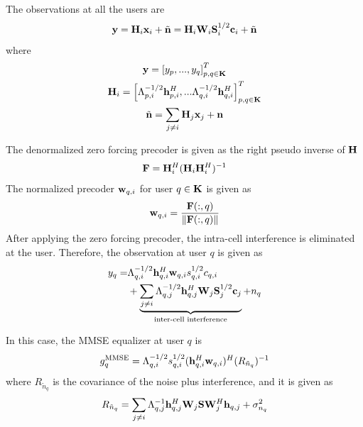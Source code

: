 \documentclass[10pt,conference]{IEEEtran}
\begin{document}
The observations at all the users are
\begin{equation}
    {\bf{y}} = {\bf{H}}_i {\bf{x}}_i + \tilde{\bf{n}} = {\bf{H}}_i {\bf{W}}_i {\bf{S}}_i^{1/2} {\bf{c}}_i + \tilde{\bf{n}}\label{eq23}
\end{equation}
where
\begin{gather}
    {\bf{y}} = \left[ y_p,...,y_q \right]^T_{p,q \in {\bf{K}}} \label{eq24}\\
    {\bf{H}}_i = \left[ \Lambda_{p,i}^{-1/2} {\bf{h}}^H_{p,i},...\Lambda_{q,i}^{-1/2} {\bf{h}}^H_{q,i} \right]^T_{p,q \in {\bf{K}}} \label{eq25}\\
    \tilde{{\bf{n}}} = \sum_{j \neq i} {\bf{H}}_j {\bf{x}}_j + {\bf{n}} \label{eq26}
\end{gather}

The denormalized zero forcing precoder is given as the right pseudo inverse of ${\bf{H}}$
\begin{equation}
    {\bf{F}} = {\bf{H}}_i^H ({\bf{H}}_i {\bf{H}}_i^H)^{-1} \label{eq27}
\end{equation}
The normalized precoder ${\bf{w}}_{q,i}$ for user $q \in {\bf{K}}$ is given as
\begin{equation}
    {\bf{w}}_{q,i} = \frac{{\bf{F}}(:,q)}{ \left\Vert {\bf{F}}(:,q) \right\Vert} \label{eq28}
\end{equation}
After applying the zero forcing precoder, the intra-cell interference is eliminated at the 
user. Therefore, the observation at user $q$ is given as
\begin{align}
    y_q = &\Lambda_{q,i}^{-1/2} {\bf{h}}^H_{q,i} {\bf{w}}_{q,i} s_{q,i}^{1/2} c_{q,i} \nonumber\\
    &+ \underbrace{\sum_{j \neq i} \Lambda_{q,j}^{-1/2} {\bf{h}}^H_{q,j} {\bf{W}}_j {\bf{S}}_j^{1/2} {\bf{c}}_j}_{\text{inter-cell interference}} + n_q \label{eq29}
\end{align}

In this case, the MMSE equalizer at user $q$ is 
\begin{equation}
    g_q^{\text{MMSE}} = \Lambda_{q,i}^{-1/2} s_{q,i}^{1/2} ({\bf{h}}_{q,i}^H {\bf{w}}_{q,i})^H (R_{\tilde{n}_q})^{-1} \label{eq30}
\end{equation}
where $R_{\tilde{n}_q}$ is the covariance of the noise plus interference, and it is given as
\begin{equation}
    R_{\tilde{n}_q} = \sum_{j \neq i} \Lambda_{q,j}^{-1} {\bf{h}}_{q,j}^H {\bf{W}}_j {\bf{S}} {\bf{W}}_j^H {\bf{h}}_{q,j} + \sigma_{n_q}^2 \label{eq31}
\end{equation}
\end{document}
